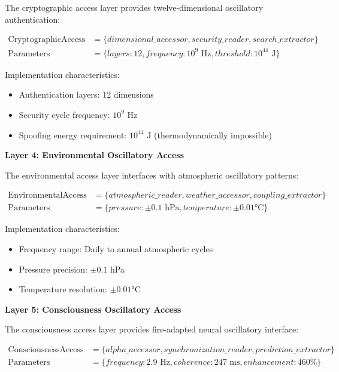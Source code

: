 \documentclass[12pt,a4paper]{article}
\begin{document}
{The cryptographic access layer provides twelve-dimensional oscillatory authentication:

\begin{align}
\text{CryptographicAccess} &= \{dimensional\_accessor, security\_reader, search\_extractor\} \\
\text{Parameters} &= \{layers: 12, frequency: 10^9 \text{ Hz}, threshold: 10^{44} \text{ J}\}
\end{align}

Implementation characteristics:
\begin{itemize}
\item Authentication layers: 12 dimensions
\item Security cycle frequency: $10^9$ Hz
\item Spoofing energy requirement: $10^{44}$ J (thermodynamically impossible)
\end{itemize}

\textbf{Layer 4: Environmental Oscillatory Access}

The environmental access layer interfaces with atmospheric oscillatory patterns:

\begin{align}
\text{EnvironmentalAccess} &= \{atmospheric\_reader, weather\_accessor, coupling\_extractor\} \\
\text{Parameters} &= \{pressure: \pm 0.1 \text{ hPa}, temperature: \pm 0.01°\text{C}\}
\end{align}

Implementation characteristics:
\begin{itemize}
\item Frequency range: Daily to annual atmospheric cycles
\item Pressure precision: $\pm 0.1$ hPa
\item Temperature resolution: $\pm 0.01$°C
\end{itemize}

\textbf{Layer 5: Consciousness Oscillatory Access}

The consciousness access layer provides fire-adapted neural oscillatory interface:

\begin{align}
\text{ConsciousnessAccess} &= \{alpha\_accessor, synchronization\_reader, prediction\_extractor\} \\
\text{Parameters} &= \{frequency: 2.9 \text{ Hz}, coherence: 247 \text{ ms}, enhancement: 460\%\}
\end{align}

}
\end{document}
